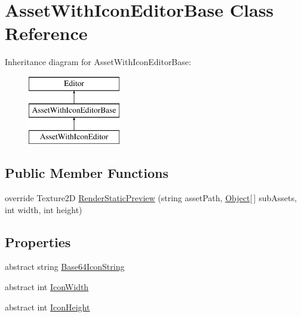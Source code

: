 \hypertarget{class_asset_with_icon_editor_base}{}\section{Asset\+With\+Icon\+Editor\+Base Class Reference}
\label{class_asset_with_icon_editor_base}
Inheritance diagram for Asset\+With\+Icon\+Editor\+Base\+:\begin{figure}[H]
\begin{center}
\leavevmode
\includegraphics[height=3.000000cm]{class_asset_with_icon_editor_base}
\end{center}
\end{figure}
\subsection*{Public Member Functions}
\begin{DoxyCompactItemize}
\item 
override Texture2D \mbox{\hyperlink{class_asset_with_icon_editor_base_a1a667f6122e158a4f8f6a46c72ad7b76}{Render\+Static\+Preview}} (string asset\+Path, \mbox{\hyperlink{_quads_8cs_aef19bab18b9814edeef255c43e4f6bbc}{Object}}\mbox{[}$\,$\mbox{]} sub\+Assets, int width, int height)
\end{DoxyCompactItemize}
\subsection*{Properties}
\begin{DoxyCompactItemize}
\item 
abstract string \mbox{\hyperlink{class_asset_with_icon_editor_base_ad639c9f4a71d958dc3b9cd510391a2e2}{Base64\+Icon\+String}}
\item 
abstract int \mbox{\hyperlink{class_asset_with_icon_editor_base_af354b35247eada1a7ba2c5d613fc6664}{Icon\+Width}}
\item 
abstract int \mbox{\hyperlink{class_asset_with_icon_editor_base_a4b3eae9920019826ba98bf5cd8ce9126}{Icon\+Height}}
\end{DoxyCompactItemize}


